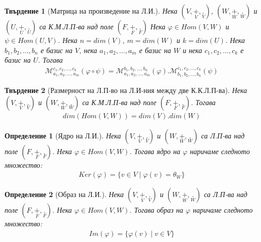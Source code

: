\documentclass[12pt]{article}
\newtheorem{proposition}{Твърдение}%
\newtheorem{definition}{Определение}%
\begin{document}
\begin{proposition}[Матрица на произведение на Л.И.]
Нека \((V, \underset{V}{+}, \underset{V}{.})\),
\((W, \underset{W}{+}, \underset{W}{.})\)
и \((U, \underset{U}{+}, \underset{U}{.})\)
са К.М.Л.П-ва над поле \((F, \underset{F}{+}, \underset{F}{.})\)
Нека \(\varphi \in Hom(V, W)\) и \(\psi \in Hom(U, V)\).
Нека \(n = dim(V)\), \(m = dim(W)\) и \(k = dim(U)\).
Нека \(b_1, b_2, \dots, b_n\) е базис на \(V\),
нека \(a_1, a_2, \dots, a_m\) е базис на \(W\)
и нека \(c_1, c_2, \dots, c_k\) е базис на \(U\).
Тогава
\begin{align*}
\mathcal{M}_{a_1, a_2, \dots, a_m}^{c_1, c_2, \dots, c_k}(\varphi \circ \psi)
=
\mathcal{M}_{a_1, a_2, \dots, a_m}^{b_1, b_2, \dots, b_n}(\varphi)
.
\mathcal{M}_{b_1, b_2, \dots, b_n}^{c_1, c_2, \dots, c_k}(\psi)
\end{align*}
\end{proposition}

\begin{proposition}[Размерност на Л.П-во на Л.И-ния между две К.К.Л.П-ва]
Нека \((V, \underset{V}{+}, \underset{V}{.})\) и \((W, \underset{W}{+}, \underset{W}{.})\) са К.М.Л.П-ва над поле \((F, \underset{F}{+}, \underset{F}{.})\).
Тогава
\begin{align*}
dim(Hom(V, W)) = dim(V).dim(W)
\end{align*}
\end{proposition}

\begin{definition}[Ядро на Л.И.]
Нека \((V, \underset{V}{+}, \underset{V}{.})\) и \((W, \underset{W}{+}, \underset{W}{.})\) са Л.П-ва над поле \((F, \underset{F}{+}, \underset{F}{.})\).
Нека \(\varphi \in Hom(V, W)\).
Тогава ядро на \(\varphi\) наричаме следното множество:
\begin{align*}
Ker(\varphi) = \{v \in V \; | \; \varphi(v) = \theta_W\}
\end{align*}
\end{definition}

\begin{definition}[Образ на Л.И.]
Нека \((V, \underset{V}{+}, \underset{V}{.})\) и \((W, \underset{W}{+}, \underset{W}{.})\) са Л.П-ва над поле \((F, \underset{F}{+}, \underset{F}{.})\).
Нека \(\varphi \in Hom(V, W)\).
Тогава образ на \(\varphi\) наричаме следното множество:
\begin{align*}
Im(\varphi) = \{\varphi(v) \; | \; v \in V\}
\end{align*}
\end{definition}
\end{document}
